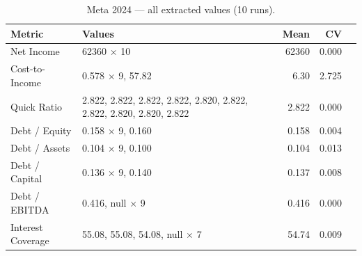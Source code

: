 \documentclass[12pt, a4paper]{article}
\newcommand{\cmark}{\textcolor{green!60!black}{\ding{51}}}  %
\newcommand{\xmark}{\textcolor{red!70!black}{\ding{55}}}    %
\begin{document}
\begin{table}[H]
\centering\small
\caption{Meta 2024 --- all extracted values (10 runs).}
\label{tab:met-raw}
\begin{tabular}{lp{8.5cm}rrc}
\toprule
\textbf{Metric} & \textbf{Values} & \textbf{Mean} & \textbf{CV} & \\
\midrule
Net Income         & 62360 $\times$ 10                                                 & 62360 & 0.000 & \cmark \\
Cost-to-Income     & 0.578 $\times$ 9, 57.82                                           &  6.30 & 2.725 & \xmark \\
Quick Ratio        & 2.822, 2.822, 2.822, 2.822, 2.820, 2.822, 2.822, 2.820, 2.820, 2.822 & 2.822 & 0.000 & \cmark \\
Debt / Equity      & 0.158 $\times$ 9, 0.160                                           & 0.158 & 0.004 & \cmark \\
Debt / Assets      & 0.104 $\times$ 9, 0.100                                           & 0.104 & 0.013 & \cmark \\
Debt / Capital     & 0.136 $\times$ 9, 0.140                                           & 0.137 & 0.008 & \cmark \\
Debt / EBITDA      & 0.416, null $\times$ 9                                            & 0.416 & 0.000 & \xmark \\
Interest Coverage  & 55.08, 55.08, 54.08, null $\times$ 7                             & 54.74 & 0.009 & \xmark \\
\bottomrule
\end{tabular}
\end{table}
\end{document}
